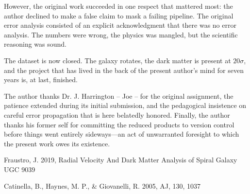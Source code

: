 \documentclass{aa}
\begin{document}
However, the original work succeeded in one respect that mattered most: the author declined to make a false claim to mask a failing pipeline. The original error analysis consisted of an explicit acknowledgment that there was no error analysis. The numbers were wrong, the physics was mangled, but the scientific reasoning was sound.

The dataset is now closed. The galaxy rotates, the dark matter is present at  $20\sigma$, and the project that has lived in the back of the present author's mind for seven years is, at last, finished.

\begin{acknowledgements}
The author thanks Dr. J. Harrington -- Joe -- for the original assignment, the patience extended during its initial submission, and the pedagogical insistence on careful error propagation that is here belatedly honored. Finally, the author thanks his former self for committing the reduced products to version control before things went entirely sideways—an act of unwarranted foresight to which the present work owes its existence.
\end{acknowledgements}




%

\begin{thebibliography}{}

     Fraustro, J. 2019,
      Radial Velocity And Dark Matter Analysis of Spiral Galaxy UGC 9039 

Catinella, B., Haynes, M. P., \& Giovanelli, R. 2005, AJ, 130, 1037
\end{thebibliography}




\begin{appendix}



\FloatBarrier %
\clearpage


\end{appendix}
\end{document}

